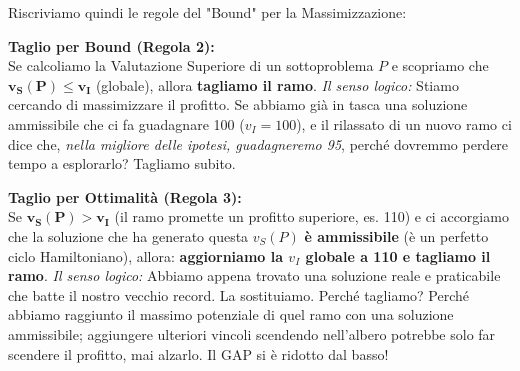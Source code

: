 \documentclass[12pt, a4paper]{article}
\newcommand{\separatore}{\noindent{\color{titlecolor!50}\rule{\textwidth}{0.6pt}}}
\begin{document}
	Riscriviamo quindi le regole del "Bound" per la Massimizzazione:
	
	\textbf{Taglio per Bound (Regola 2):}\\
	Se calcoliamo la Valutazione Superiore di un sottoproblema $P$ e scopriamo che $\mathbf{v_S(P) \leq v_I}$ (globale), allora \textbf{tagliamo il ramo}.
	\textit{Il senso logico:} Stiamo cercando di massimizzare il profitto. Se abbiamo già in tasca una soluzione ammissibile che ci fa guadagnare 100 ($v_I = 100$), e il rilassato di un nuovo ramo ci dice che, \textit{nella migliore delle ipotesi, guadagneremo 95}, perché dovremmo perdere tempo a esplorarlo? Tagliamo subito.
	
	\textbf{Taglio per Ottimalità (Regola 3):}\\
	Se $\mathbf{v_S(P) > v_I}$ (il ramo promette un profitto superiore, es. 110) e ci accorgiamo che la soluzione che ha generato questa $v_S(P)$ \textbf{è ammissibile} (è un perfetto ciclo Hamiltoniano), allora: \textbf{aggiorniamo la $v_I$ globale a 110 e tagliamo il ramo}.
	\textit{Il senso logico:} Abbiamo appena trovato una soluzione reale e praticabile che batte il nostro vecchio record. La sostituiamo. Perché tagliamo? Perché abbiamo raggiunto il massimo potenziale di quel ramo con una soluzione ammissibile; aggiungere ulteriori vincoli scendendo nell'albero potrebbe solo far scendere il profitto, mai alzarlo. Il GAP si è ridotto dal basso!
	
	\vspace{0.6cm}
	\separatore
	\vspace{0.4cm}
	
\end{document}

